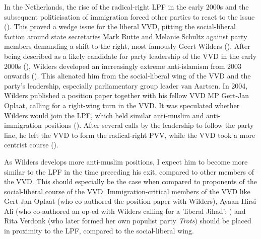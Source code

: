 \documentclass{article}
\begin{document}
In the Netherlands, the rise of the radical-right LPF in the early 2000s and the subsequent politicisation of immigration forced other parties to react to the issue (\cite{DeVries2012c, Pennings2003}). This proved a wedge issue for the liberal VVD, pitting the social-liberal faction around state secretaries Mark Rutte and Melanie Schultz against party members demanding a shift to the right, most famously Geert Wilders (\cite{VandeWardt2014, Vossen2011}). After being described as a likely candidate for party leadership of the VVD in the early 2000s (\cite[182]{Vossen2011}), Wilders developed an increasingly extreme anti-islamism from 2003 onwards (\cite[26]{Vossen2010}). This alienated him from the social-liberal wing of the VVD and the party's leadership, especially parliamentary group leader van Aartsen. In 2004, Wilders published a position paper together with his fellow VVD MP Gert-Jan Oplaat, calling for a right-wing turn in the VVD. It was speculated whether Wilders would join the LPF, which held similar anti-muslim and anti-immigration positions (\cite{Parool2004Wilders, Handelsblad2008Wilders}). After several calls by the leadership to follow the party line, he left the VVD to form the radical-right PVV, while the VVD took a more centrist course (\cite{Vossen2010, Vossen2011}). \par

As Wilders develops more anti-muslim positions, I expect him to become more similar to the LPF in the time preceding his exit, compared to other members of the VVD. This should especially be the case when compared to proponents of the social-liberal course of the VVD. Immigration-critical members of the VVD like Gert-Jan Oplaat (who co-authored the position paper with Wilders), Ayaan Hirsi Ali (who co-authored an op-ed with Wilders calling for a 'liberal Jihad'; \cite[183]{Vossen2011}) and Rita Verdonk (who later formed her own populist party \textit{Trots}) should be placed in proximity to the LPF, compared to the social-liberal wing. \par
\end{document}
